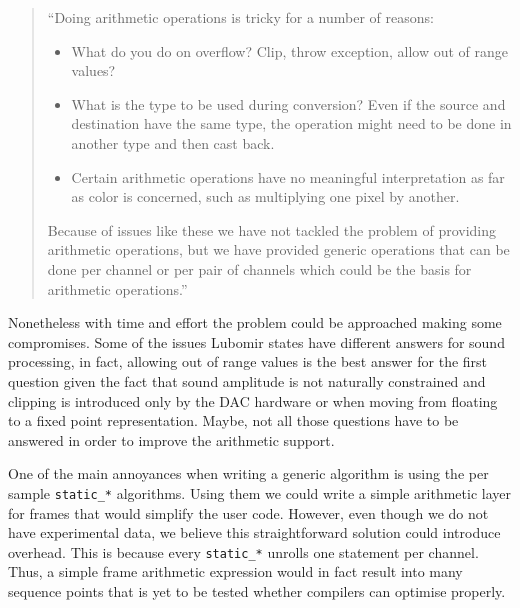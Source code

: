 \begin{quotation}
``Doing arithmetic operations is tricky for a number of reasons:

\begin{itemize}
\item What do you do on overflow? Clip, throw exception, allow out of
  range values?

\item What is the type to be used during conversion? Even if the
  source and destination have the same type, the operation might need
  to be done in another type and then cast back.

\item Certain arithmetic operations have no meaningful interpretation
  as far as color is concerned, such as multiplying one pixel by
  another. 
\end{itemize}

Because of issues like these we have not tackled the problem of
providing arithmetic operations, but we have provided generic
operations that can be done per channel or per pair of channels which
could be the basis for arithmetic operations.''
\end{quotation}

Nonetheless with time and effort the problem could be
approached making some compromises. Some of the issues Lubomir states
have different answers for sound processing, in fact, allowing out of
range values is the best answer for the first question given the fact
that sound amplitude is not naturally constrained and clipping is
introduced only by the DAC hardware or when moving from floating to a
fixed point representation. Maybe, not all those questions have to be
answered in order to improve the arithmetic support.

One of the main annoyances when writing a generic algorithm is using
the per sample \texttt{static\_*} algorithms. Using them we could
write a simple arithmetic layer for frames that would simplify the
user code. However, even though we do not have experimental data, we
believe this straightforward solution could introduce overhead. This
is because every \texttt{static\_*} unrolls one statement per
channel. Thus, a simple frame arithmetic expression would in fact
result into many sequence points that is yet to be tested whether
compilers can optimise properly.

